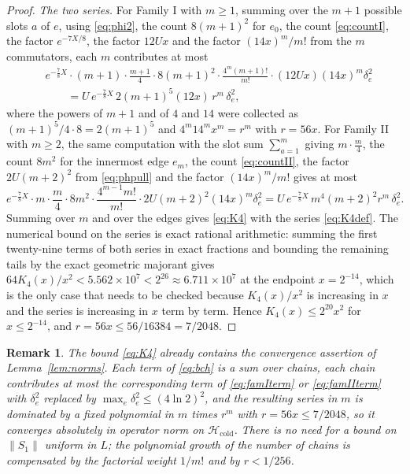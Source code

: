 \documentclass[11pt]{article}
\theoremstyle{plain}
\newtheorem{remark}{Remark}
\theoremstyle{definition}
\begin{document}
\begin{proof}
\emph{The two series.} For Family I with $m\ge1$, summing over the $m+1$ possible
slots $a$ of $e$, using \eqref{eq:phi2}, the count $8(m+1)^{2}$ for $e_0$, the
count \eqref{eq:countI}, the factor $e^{-7X/8}$, the factor $12Ux$ and the factor
$(14x)^{m}/m!$ from the $m$ commutators, each $m$ contributes at most
\begin{align}
&e^{-\frac78X}\cdot(m+1)\cdot\frac{m+1}{4}\cdot8(m+1)^{2}\cdot\frac{4^{m}(m+1)!}{m!}\cdot(12Ux)(14x)^{m}\delta_e^{2}
\nonumber\\
&\qquad=U\,e^{-\frac78X}\,2(m+1)^{5}(12x)\,r^{m}\,\delta_e^{2},
\label{eq:famIterm}
\end{align}
where the powers of $m+1$ and of $4$ and $14$ were collected as
$(m+1)^{5}/4\cdot8=2(m+1)^{5}$ and $4^{m}14^{m}x^{m}=r^{m}$ with $r=56x$. For
Family II with $m\ge2$, the same computation with the slot sum $\sum_{a=1}^{m}$
giving $m\cdot\frac{m}{4}$, the count $8m^{2}$ for the innermost edge $e_m$, the count
\eqref{eq:countII}, the factor $2U(m+2)^{2}$ from \eqref{eq:phpull} and the factor
$(14x)^{m}/m!$ gives at most
\begin{equation}\label{eq:famIIterm}
e^{-\frac78X}\cdot m\cdot\frac m4\cdot8m^{2}\cdot\frac{4^{m-1}m!}{m!}\cdot2U(m+2)^{2}(14x)^{m}\delta_e^{2}
=U\,e^{-\frac78X}\,m^{4}(m+2)^{2}r^{m}\,\delta_e^{2} .
\end{equation}
Summing over $m$ and over the edges gives \eqref{eq:K4} with the series
\eqref{eq:K4def}. The numerical bound on the series is exact rational arithmetic:
summing the first twenty-nine terms of both series in exact fractions and bounding
the remaining tails by the exact geometric majorant gives
$64K_4(x)/x^{2}<5.562\times10^{7}<2^{26}\approx6.711\times10^{7}$ at the endpoint
$x=2^{-14}$, which is the only case that needs to be checked because $K_4(x)/x^{2}$
is increasing in $x$ and the series is increasing in $x$ term by term. Hence
$K_4(x)\le2^{20}x^{2}$ for $x\le2^{-14}$, and $r=56x\le56/16384=7/2048$.
\end{proof}

\begin{remark}\label{rem:noabs}
The bound \eqref{eq:K4} already contains the convergence assertion of
Lemma~\ref{lem:norms}. Each term of \eqref{eq:bch} is a sum over chains, each
chain contributes at most the corresponding term of \eqref{eq:famIterm} or
\eqref{eq:famIIterm} with $\delta_e^{2}$ replaced by $\max_e\delta_e^{2}\le(4\ln2)^{2}$,
and the resulting series in $m$ is dominated by a fixed polynomial in $m$ times
$r^{m}$ with $r=56x\le7/2048$, so it converges absolutely in operator norm on
$\mathcal{H}_{\mathrm{cold}}$. There is no need for a bound on $\|S_1\|$ uniform in
$L$; the polynomial growth of the number of chains is compensated by the factorial
weight $1/m!$ and by $r<1/256$.
\end{remark}
\end{document}
